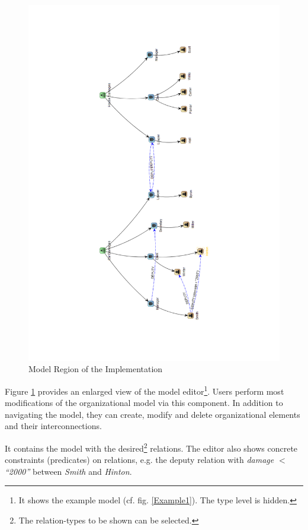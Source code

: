 \begin{figure}
\centering
\includegraphics[width=\textwidth]{Figures/corg-graph.pdf}
\caption{Model Region of the Implementation}
\label{proto-model}
\end{figure}

Figure \ref{proto-model} provides an enlarged view of the model editor\footnote{It shows the example model (cf. fig. \ref{Example1}). The type level is hidden.}.
Users perform most modifications of the organizational model via this component.
In addition to navigating the model, they can create, modify and delete organizational elements and their interconnections.

It contains the model with the desired\footnote{The relation-types to be shown can be selected.} relations. The editor also shows concrete constraints (predicates) on relations, e.g. the deputy relation with \emph{damage $<$ ``2000''} between \emph{Smith} and \emph{Hinton}.


